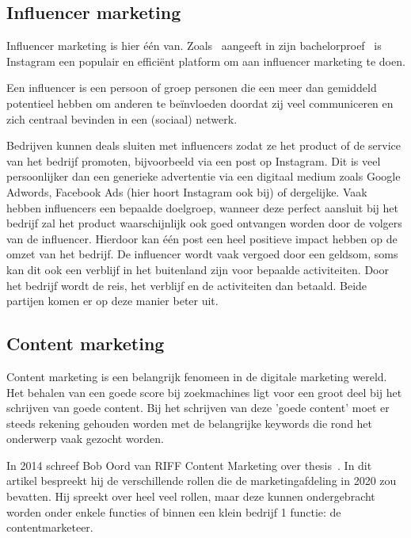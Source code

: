 \subsection{Influencer marketing}
\label{sec:influencer-marketing}
Influencer marketing is hier één van. Zoals~\textcite{Pieters2018} aangeeft in zijn bachelorproef~ is Instagram een populair en efficiënt platform om aan influencer marketing te doen. 

Een influencer is een persoon of groep personen die een meer dan gemiddeld potentieel hebben om anderen te beïnvloeden doordat zij veel communiceren en zich centraal bevinden in een (sociaal) netwerk.~\autocite{Pieters2018}

Bedrijven kunnen deals sluiten met influencers zodat ze het product of de service van het bedrijf promoten, bijvoorbeeld via een post op Instagram. Dit is veel persoonlijker dan een generieke advertentie via een digitaal medium zoals Google Adwords, Facebook Ads (hier hoort Instagram ook bij) of dergelijke. Vaak hebben influencers een bepaalde doelgroep, wanneer deze perfect aansluit bij het bedrijf zal het product waarschijnlijk ook goed ontvangen worden door de volgers van de influencer. Hierdoor kan één post een heel positieve impact hebben op de omzet van het bedrijf. De influencer wordt vaak vergoed door een geldsom, soms kan dit ook een verblijf in het buitenland zijn voor bepaalde activiteiten. Door het bedrijf wordt de reis, het verblijf en de activiteiten dan betaald. Beide partijen komen er op deze manier beter uit.


\subsection{Content marketing}
\label{sec:content-marketing}
Content marketing is een belangrijk fenomeen in de digitale marketing wereld. Het behalen van een goede score bij zoekmachines ligt voor een groot deel bij het schrijven van goede content. Bij het schrijven van deze 'goede content' moet er steeds rekening gehouden worden met de belangrijke keywords die rond het onderwerp vaak gezocht worden. 

In 2014 schreef Bob Oord van RIFF Content Marketing over thesis~. In dit artikel bespreekt hij de verschillende rollen die de marketingafdeling in 2020 zou bevatten. Hij spreekt over heel veel rollen, maar deze kunnen ondergebracht worden onder enkele functies of binnen een klein bedrijf 1 functie: de contentmarketeer. 

